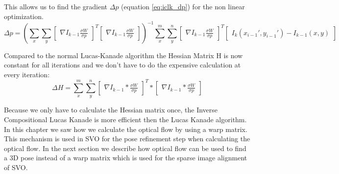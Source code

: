 \documentclass[11pt,a4paper,titlepage,oneside]{report}
\begin{document}
This allows us to find the gradient $\Delta p$ (equation \ref{eq:iclk_dp}) for the non linear optimization.
\tiny
\begin{equation}\label{eq:iclk_dp}
  \Delta p=(\sum_x\sum_y\begin{bmatrix}\nabla I_{k-1}\frac{\sigma W}{\sigma p}\end{bmatrix}^T\begin{bmatrix}\nabla I_{k-1}\frac{\sigma W}{\sigma p}\end{bmatrix})^{-1}
  \sum_x^m\sum_y^n\begin{bmatrix}\nabla I_{k-1}\frac{\sigma W}{\sigma p}\end{bmatrix}^T\begin{bmatrix}I_{k}(x_{i-1}',y_{i-1}') - I_{k-1}(x,y)\end{bmatrix}
\end{equation}
\normalsize

Compared to the normal Lucas-Kanade algorithm the Hessian Matrix H is now constant for all iterations and we don't have to do the expensive calculation at every iteration:
\begin{equation}
  \Delta H=\sum_x^m\sum_y^n\begin{bmatrix}\nabla I_{k-1}*\frac{\sigma W}{\sigma p}\end{bmatrix}^T*\begin{bmatrix}\nabla I_{k-1}*\frac{\sigma W}{\sigma p}\end{bmatrix}
\end{equation}

Because we only have to calculate the Hessian matrix once, the Inverse Compositional Lucas Kanade is more efficient then the Lucas Kanade algorithm.\\
In this chapter we saw how we calculate the optical flow by using a warp matrix. This mechanism is used in SVO for the pose refinement step when calculating the optical flow. In the next section we describe how optical flow can be used to find a 3D pose instead of a warp matrix which is used for the sparse image alignment of SVO.
\end{document}
